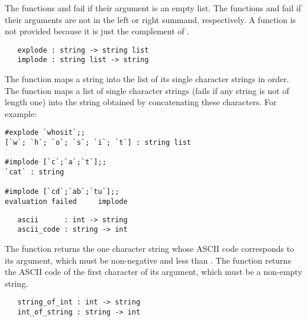 \noindent The functions  and  fail if their argument is an empty
list. The functions  and  fail if their arguments are not
in the left or right summand, respectively. A function  is not
provided because it is just the complement of .

\begin{boxed}
\begin{verbatim}
   explode : string -> string list
   implode : string list -> string 
\end{verbatim}\end{boxed}


The function  maps a string into the list of its single character
strings in order. The function  maps a list of single character 
strings (fails if
any string is not of length one) into the string obtained by
concatenating these characters.  For example:

\setcounter{sessioncount}{1}
\begin{session}\begin{verbatim}
#explode `whosit`;;
[`w`; `h`; `o`; `s`; `i`; `t`] : string list

#implode [`c`;`a`;`t`];;
`cat` : string

#implode [`cd`;`ab`;`tu`];;
evaluation failed     implode
\end{verbatim}\end{session}


\begin{boxed}
\begin{verbatim}
   ascii      : int -> string
   ascii_code : string -> int
\end{verbatim}\end{boxed}

The function  returns the one character string whose 
{\small ASCII} code corresponds to its
argument, which must be non-negative and less than . The function
 returns the {\small ASCII} code of the first character 
of its argument,
which must be a non-empty string.

\begin{boxed}
\begin{verbatim}
   string_of_int : int -> string
   int_of_string : string -> int
\end{verbatim}\end{boxed}

